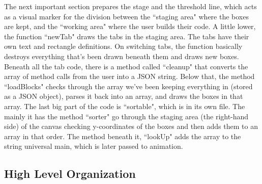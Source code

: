 \documentclass[a4paper]{article}
\begin{document}
The next important section prepares the stage and the threshold line, which acts as a visual marker for the division between the ``staging area" where the boxes are kept, and the ``working area" where the user builds their code. A little lower, the function ``newTab" draws the tabs in the staging area. The tabs have their own text and rectangle definitions. On switching tabs, the function basically destroys everything that's been drawn beneath them and draws new boxes. 
Beneath all the tab code, there is a method called ``cleanup" that converts the array of method calls from the user into a JSON string. Below that, the method ``loadBlocks" checks through the array we've been keeping everything in (stored as a JSON object), parses it back into an array, and draws the boxes in that array. The last big part of the code is ``sortable", which is in its own file. The mainly it has the method ``sorter" go through the staging area (the right-hand side) of the canvas checking y-coordinates of the boxes and then adds them to an array in that order. The method beneath it, ``lookUp" adds the array to the string universal main, which is later passed to animation.
\subsection{High Level Organization}
\end{document}
